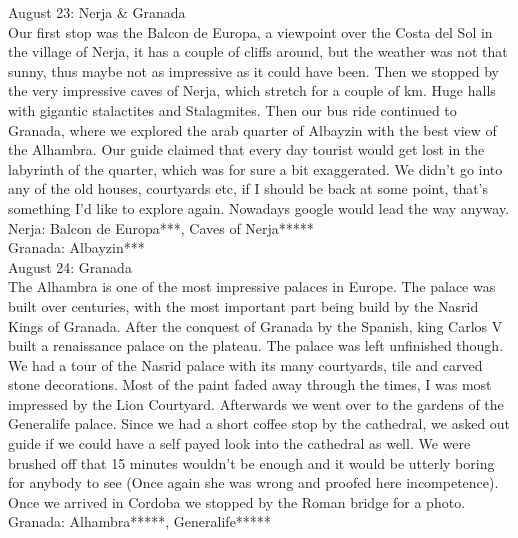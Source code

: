 August 23: Nerja \& Granada\\
Our first stop was the Balcon de Europa, a viewpoint over the Costa del Sol in the village of Nerja, it has a couple of cliffs around, but the weather was not that sunny, thus maybe not as impressive as it could have been. Then we stopped by the very impressive caves of Nerja, which stretch for a couple of km. Huge halls with gigantic stalactites and Stalagmites. Then our bus ride continued to Granada, where we explored the arab quarter of Albayzin with the best view of the Alhambra. Our guide claimed that every day tourist would get lost in the labyrinth of the quarter, which was for sure a bit exaggerated. We didn't go into any of the old houses, courtyards etc, if I should be back at some point, that's something I'd like to explore again. Nowadays google would lead the way anyway.\\


Nerja: Balcon de Europa***, Caves of Nerja*****\\
Granada: Albayzin***\\

August 24: Granada\\
The Alhambra is one of the most impressive palaces in Europe. The palace was built over centuries, with the most important part being build by the Nasrid Kings of Granada. After the conquest of Granada by the Spanish, king Carlos V built a renaissance palace on the plateau. The palace was left unfinished though. We had a tour of the Nasrid palace with its many courtyards, tile and carved stone decorations. Most of the paint faded away through the times, I was most impressed by the Lion Courtyard. Afterwards we went over to the gardens of the Generalife palace. Since we had a short coffee stop by the cathedral, we asked out guide if we could have a self payed look into the cathedral as well. We were brushed off that 15 minutes wouldn't be enough and it would be utterly boring for anybody to see (Once again she was wrong and proofed here incompetence). Once we arrived in Cordoba we stopped by the Roman bridge for a photo.\\

Granada: Alhambra*****, Generalife*****\\

